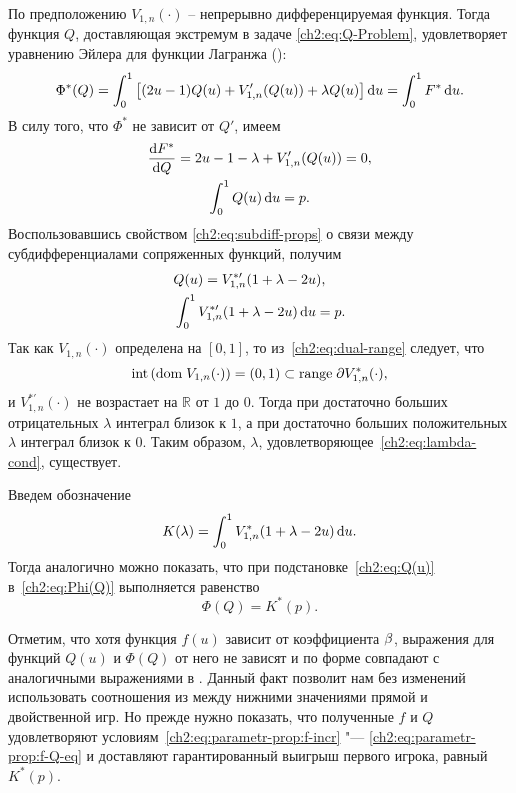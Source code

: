 {По предположению $V_{1,n}(\cdot)$ -- непрерывно дифференцируемая функция.
Тогда функция $Q$, доставляющая экстремум в задаче \eqref{ch2:eq:Q-Problem}, удовлетворяет уравнению Эйлера для функции Лагранжа (\seename \cite{elsgolc69}):
\begin{equation*}
  \Phi^*(Q) =
  \int_0^1 \left[
     (2u - 1) Q(u) + V_{1,n}'(Q(u)) + \lambda Q(u)
   \right] \mathop{}\!\mathrm{d} u =
  \int_0^1 F^* \mathop{}\!\mathrm{d} u.
\end{equation*}
В силу того, что $\Phi^*$ не зависит от $Q'$, имеем
\begin{gather*}
  \frac{\mathop{}\!\mathrm{d} F^*}{\mathop{}\!\mathrm{d} Q} = 2u - 1 - \lambda + V_{1,n}'(Q(u)) = 0,\\
  \int_0^1 Q(u) \mathop{}\!\mathrm{d} u = p.
\end{gather*}
Воспользовавшись свойством \eqref{ch2:eq:subdiff-props} о связи между субдифференциалами сопряженных функций, получим
\begin{align}
  \label{ch2:eq:Q(u)}
  &Q(u) = V^{*\prime}_{1,n}(1+\lambda-2u),\\
  \label{ch2:eq:lambda-cond}
  &\int_0^1 V^{*\prime}_{1,n}(1+\lambda-2u) \mathop{}\!\mathrm{d} u = p.
\end{align}
Так как $V_{1,n}(\cdot)$ определена на $[0, 1]$, то из~\eqref{ch2:eq:dual-range} следует, что
\begin{equation*}
  \mathrm{int} \left( \mathrm{dom\;} V_{1,n}(\cdot) \right)
  = (0, 1)
  \subset \mathrm{range\;} \partial V_{1,n}^*(\cdot),
\end{equation*}
и $V^{*\prime}_{1,n}(\cdot)$ не возрастает на $\mathbb{R}$ от $1$ до $0$.
Тогда при достаточно больших отрицательных $\lambda$ интеграл близок к $1$, а при достаточно больших положительных $\lambda$ интеграл близок к 0.
Таким образом, $\lambda$, удовлетворяющее~\eqref{ch2:eq:lambda-cond}, существует.

Введем обозначение
\begin{equation*}
  K(\lambda) = \int_0^1 V^*_{1,n}(1+\lambda-2u) \mathop{}\!\mathrm{d} u.
\end{equation*}
Тогда аналогично \cite{demeyer02} можно показать, что при подстановке~\eqref{ch2:eq:Q(u)} в~\eqref{ch2:eq:Phi(Q)} выполняется равенство
\begin{equation}\label{ch2:eq:phi=k*}
  \Phi(Q) = K^*(p).
\end{equation}

Отметим, что хотя функция $f(u)$ зависит от коэффициента $\beta$, выражения для функций $Q(u)$ и $\Phi(Q)$ от него не зависят и по форме совпадают с аналогичными выражениями в \cite{demeyer02}.
Данный факт позволит нам без изменений использовать соотношения из \cite{demeyer02} между нижними значениями прямой и двойственной игр.
Но прежде нужно показать, что полученные $f$ и $Q$ удовлетворяют условиям~\eqref{ch2:eq:parametr-prop:f-incr} "--- \eqref{ch2:eq:parametr-prop:f-Q-eq} и доставляют гарантированный выигрыш первого игрока, равный $K^*(p)$.

}
